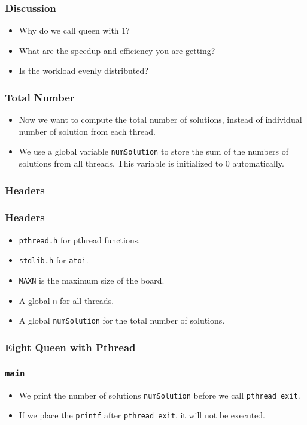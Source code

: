 \documentclass{beamer}
\begin{document}
\begin{frame}
\frametitle{Discussion}
\begin{itemize}
\item Why do we call queen with 1?
\item What are the speedup and efficiency you are getting?
\item Is the workload evenly distributed?
\end{itemize}
\end{frame}

\begin{frame}
\frametitle{Total Number}
\begin{itemize}
\item Now we want to compute the total number of solutions, instead of
  individual number of solution from each thread.
\item We use a global variable {\tt numSolution} to store the sum of
  the numbers of solutions from all threads.  This variable is
  initialized to 0 automatically.
\end{itemize}
\end{frame}

\begin{frame}
\frametitle{Headers}
\end{frame}

\begin{frame}
\frametitle{Headers} 
\begin{itemize}
\item {\tt pthread.h} for pthread functions.
\item {\tt stdlib.h} for {\tt atoi}.
\item {\tt MAXN} is the maximum size of the board.
\item A global {\tt n} for all threads.
\item A global {\tt numSolution} for the total number of solutions.
\end{itemize}
\end{frame}

\begin{frame}
\frametitle{Eight Queen with Pthread}
\end{frame}

\begin{frame}
\frametitle{\tt main}
\begin{itemize}
\item We print the number of solutions {\tt numSolution} before we
  call {\tt pthread\_exit}.
\item If we place the {\tt printf} after {\tt pthread\_exit}, it will
  not be executed.
\end{itemize}
\end{frame}
\end{document}

